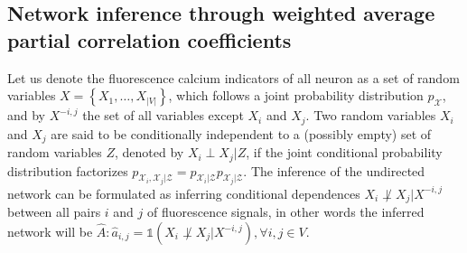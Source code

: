 \documentclass[wcp]{jmlr}
\begin{document}


\subsection{Network inference through weighted average partial correlation
            coefficients}
\label{sec:inference}




Let us denote the fluorescence calcium indicators of all neuron
as a set of random variables $X = \left\{X_1, \ldots, X_{|V|}\right\}$, which follows
a joint probability distribution $p_\mathcal{X}$, and by
$X^{-i,j}$ the set of all variables except $X_i$ and $X_j$.
Two random variables $X_i$ and $X_j$ are said to be conditionally independent
to a (possibly empty) set of random variables $Z$, denoted by $X_i \perp X_j | Z$,
if the joint conditional probability distribution factorizes
$p_{\mathcal{X}_i, \mathcal{X}_j|\mathcal{Z}} = p_{\mathcal{X}_i|\mathcal{Z}}
p_{\mathcal{X}_j|\mathcal{Z}}$.  The inference of the undirected network
can be formulated as inferring conditional dependences
$X_i \not\perp X_j | X^{-i,j}$ between all pairs $i$ and $j$ of fluorescence
signals, in other words the inferred network will be
$\hat{A}: \hat{a}_{i,j} = \mathbb{1}(X_i \not\perp X_j | X^{-i,j}), \forall i, j \in V$.
\end{document}
